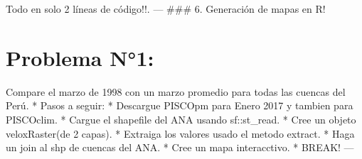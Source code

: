 \documentclass[]{article}
\newenvironment{Shaded}{\begin{snugshade}}{\end{snugshade}}
\newcommand{\KeywordTok}[1]{\textcolor[rgb]{0.13,0.29,0.53}{\textbf{#1}}}
\newcommand{\DataTypeTok}[1]{\textcolor[rgb]{0.13,0.29,0.53}{#1}}
\newcommand{\StringTok}[1]{\textcolor[rgb]{0.31,0.60,0.02}{#1}}
\newcommand{\OtherTok}[1]{\textcolor[rgb]{0.56,0.35,0.01}{#1}}
\newcommand{\OperatorTok}[1]{\textcolor[rgb]{0.81,0.36,0.00}{\textbf{#1}}}
\newcommand{\NormalTok}[1]{#1}
\begin{document}
 Todo en solo 2 líneas de código!!. --- \#\#\# 6. Generación de mapas en
R!

\begin{Shaded}
\end{Shaded}

\section{Problema N°1:}\label{problema-n1}

Compare el marzo de 1998 con un marzo promedio para todas las cuencas
del Perú. * Pasos a seguir: * Descargue PISCOpm para Enero 2017 y
tambien para PISCOclim. * Cargue el shapefile del ANA usando
sf::st\_read. * Cree un objeto veloxRaster(de 2 capas). * Extraiga los
valores usado el metodo extract. * Haga un join al shp de cuencas del
ANA. * Cree un mapa interacctivo. * BREAK! ---
\end{document}
